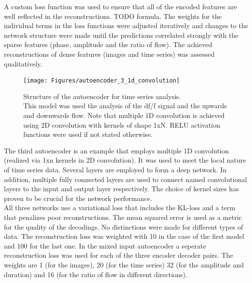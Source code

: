 A custom loss function was used to ensure that all of the encoded features are well reflected in the reconstructions. TODO formula. The weights for the individual terms in the loss functions were adjusted iteratively and changes to the network structure were made until the predictions correlated strongly with the sparse features (phase, amplitude and the ratio of flow). The achieved reconstructions of dense features (images and time series) was assessed qualitatively.\\
\begin{figure}[!htb]
\centering
\texttt{[image: Figures/autoencoder\_3\_1d\_convolution]}
\decoRule
\caption[Structure of the autoencoder for time series analysis]{Structure of the autoencoder for time series analysis.\\ This model was used the analysis of the df/f signal and the upwards and downwards flow. Note that multiple 1D convolution is achieved using 2D convolution with kernels of shape 1xN. RELU activation functions were used if not stated otherwise.}
\label{fig:autoencoder_3_1d_convolution}
\end{figure}
The third autoencoder is an example that employs multiple 1D convolution (realized via 1xn kernels in 2D convolution). It was used to meet the local nature of time series data. Several layers are employed to form a deep network. In addition, multiple fully connected layers are used to connect named convolutional layers to the input and output layer respectively. The choice of kernel sizes has proven to be crucial for the network performance.\\
All three networks use a variational loss that includes the KL-loss and a term that penalizes poor reconstructions. The mean squared error is used as a metric for the quality of the decodings. No distinctions were made for different types of data. The reconstruction loss was weighted with 10 in the case of the first model and 100 for the last one. In the mixed input autoencoder a seperate reconstruction loss was used for each of the three encoder decoder pairs. The weights are 1 (for the images), 20 (for the time series) 32 (for the amplitude and duration) and 16 (for the ratio of flow in different directions).

